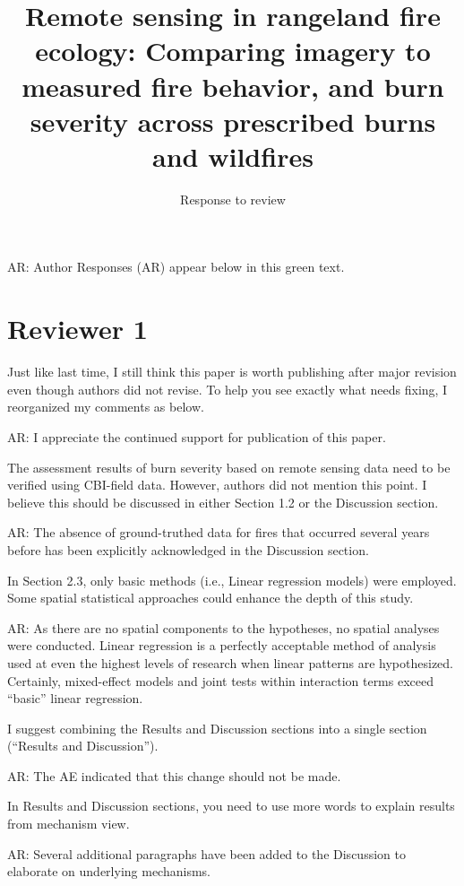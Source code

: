 \documentclass[parskip=half, american]{scrartcl}
\title{\Large Remote sensing in rangeland fire ecology: Comparing imagery to measured fire behavior, and burn severity across prescribed burns and wildfires  }
\subtitle{Response to review}
\author{ }
\date{}
\newcommand{\AR}[1]
	{\color{PineGreen}AR: #1\color{black} \par }
\begin{document}
\maketitle

\vspace{-2cm} 

\AR{Author Responses (AR) appear below in this green text.}

\section*{Reviewer 1}

Just like last time, I still think this paper is worth publishing after major revision even though authors did not revise. 
To help you see exactly what needs fixing, I reorganized my comments as below.

\AR{I appreciate the continued support for publication of this paper.}

The assessment results of burn severity based on remote sensing data need to be verified using CBI-field data. 
However, authors did not mention this point. I believe this should be discussed in either Section 1.2 or the Discussion section.

\AR{The absence of ground-truthed data for fires that occurred several years before has been explicitly acknowledged in the Discussion section.} 
	
In Section 2.3, only basic methods (i.e., Linear regression models) were employed. Some spatial statistical approaches could enhance the depth of this study.

\AR{As there are no spatial components to the hypotheses, no spatial analyses were conducted.
	Linear regression is a perfectly acceptable method of analysis used at even the highest levels of research when linear patterns are hypothesized. 
	Certainly, mixed-effect models and joint tests within interaction terms exceed ``basic'' linear regression.}
	
I suggest combining the Results and Discussion sections into a single section (``Results and Discussion'').

\AR{The AE indicated that this change should not be made.}
	
In Results and Discussion sections, you need to use more words to explain results from mechanism view. 

\AR{Several additional paragraphs have been added to the Discussion to elaborate on underlying mechanisms. }
\end{document}
